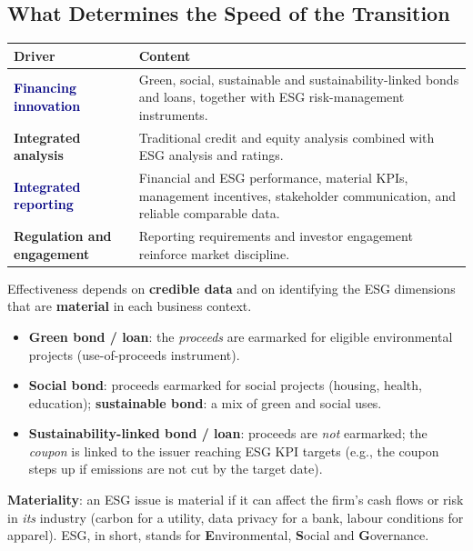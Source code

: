 \subsection{What Determines the Speed of the Transition}
\begin{center}
\small
\begin{tabular}{@{}p{3.6cm}p{11cm}@{}}
\toprule
\textbf{Driver} & \textbf{Content}\\
\midrule
\textcolor{navy}{\textbf{Financing innovation}} & Green, social, sustainable and sustainability-linked bonds and loans, together with ESG risk-management instruments.\\
\textcolor{keyred}{\textbf{Integrated analysis}} & Traditional credit and equity analysis combined with ESG analysis and ratings.\\
\textcolor{navy}{\textbf{Integrated reporting}} & Financial and ESG performance, material KPIs, management incentives, stakeholder communication, and reliable comparable data.\\
\textcolor{keyred}{\textbf{Regulation and engagement}} & Reporting requirements and investor engagement reinforce market discipline.\\
\bottomrule
\end{tabular}
\end{center}
\begin{keybox}
Effectiveness depends on \textbf{credible data} and on identifying the ESG dimensions that are \textbf{material} in each business context.
\end{keybox}
\begin{addbox}
\begin{itemize}
  \item \textbf{Green bond / loan}: the \emph{proceeds} are earmarked for eligible environmental projects (use-of-proceeds instrument).
  \item \textbf{Social bond}: proceeds earmarked for social projects (housing, health, education); \textbf{sustainable bond}: a mix of green and social uses.
  \item \textbf{Sustainability-linked bond / loan}: proceeds are \emph{not} earmarked; the \emph{coupon} is linked to the issuer reaching ESG KPI targets (e.g., the coupon steps up if emissions are not cut by the target date).
\end{itemize}
\textbf{Materiality}: an ESG issue is material if it can affect the firm's cash flows or risk in \emph{its} industry (carbon for a utility, data privacy for a bank, labour conditions for apparel). ESG, in short, stands for \textbf{E}nvironmental, \textbf{S}ocial and \textbf{G}overnance.
\end{addbox}

